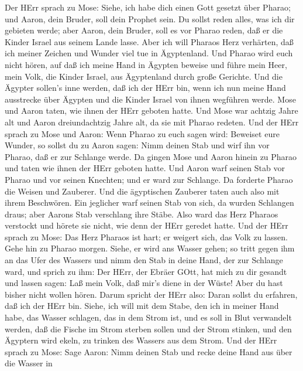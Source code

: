  Der HErr sprach zu Mose: Siehe, ich habe dich einen Gott
gesetzt über Pharao; und Aaron, dein Bruder, soll dein Prophet sein.
 Du sollst reden alles, was ich dir gebieten werde; aber
Aaron, dein Bruder, soll es vor Pharao reden, daß er die Kinder Israel
aus seinem Lande lasse.  Aber ich will Pharaos Herz
verhärten, daß ich meiner Zeichen und Wunder viel tue in Ägyptenland.
 Und Pharao wird euch nicht hören, auf daß ich meine Hand in
Ägypten beweise und führe mein Heer, mein Volk, die Kinder Israel, aus
Ägyptenland durch große Gerichte.  Und die Ägypter sollen's
inne werden, daß ich der HErr bin, wenn ich nun meine Hand ausstrecke
über Ägypten und die Kinder Israel von ihnen wegführen werde.
 Mose und Aaron taten, wie ihnen der HErr geboten hatte.
 Und Mose war achtzig Jahre alt und Aaron dreiundachtzig
Jahre alt, da sie mit Pharao redeten.  Und der HErr sprach
zu Mose und Aaron:  Wenn Pharao zu euch sagen wird: Beweiset
eure Wunder, so sollst du zu Aaron sagen: Nimm deinen Stab und wirf ihn
vor Pharao, daß er zur Schlange werde.  Da gingen Mose und
Aaron hinein zu Pharao und taten wie ihnen der HErr geboten hatte. Und
Aaron warf seinen Stab vor Pharao und vor seinen Knechten; und er ward
zur Schlange.  Da forderte Pharao die Weisen und Zauberer.
Und die ägyptischen Zauberer taten auch also mit ihrem Beschwören.
 Ein jeglicher warf seinen Stab von sich, da wurden
Schlangen draus; aber Aarons Stab verschlang ihre Stäbe. 
Also ward das Herz Pharaos verstockt und hörete sie nicht, wie denn der
HErr geredet hatte.  Und der HErr sprach zu Mose: Das Herz
Pharaos ist hart; er weigert sich, das Volk zu lassen. 
Gehe hin zu Pharao morgen. Siehe, er wird ans Wasser gehen; so tritt
gegen ihm an das Ufer des Wassers und nimm den Stab in deine Hand, der
zur Schlange ward,  und sprich zu ihm: Der HErr, der Ebräer
GOtt, hat mich zu dir gesandt und lassen sagen: Laß mein Volk, daß mir's
diene in der Wüste! Aber du hast bisher nicht wollen hören.
 Darum spricht der HErr also: Daran sollst du erfahren, daß
ich der HErr bin. Siehe, ich will mit dem Stabe, den ich in meiner Hand
habe, das Wasser schlagen, das in dem Strom ist, und es soll in Blut
verwandelt werden,  daß die Fische im Strom sterben sollen
und der Strom stinken, und den Ägyptern wird ekeln, zu trinken des
Wassers aus dem Strom.  Und der HErr sprach zu Mose: Sage
Aaron: Nimm deinen Stab und recke deine Hand aus über die Wasser in
